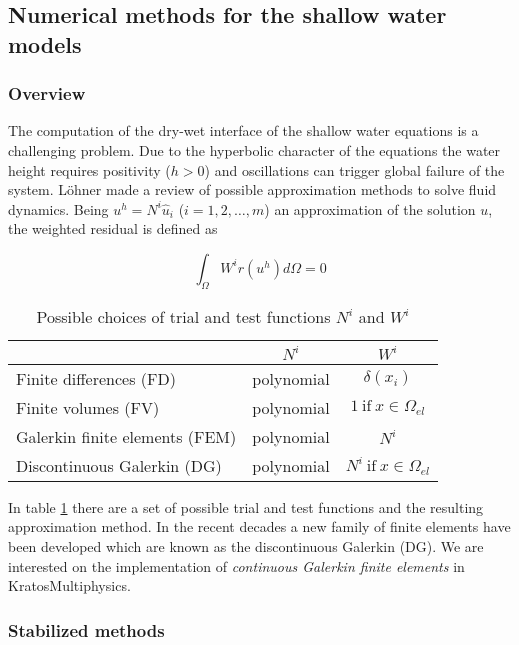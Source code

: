 \subsection{Numerical methods for the shallow water models}


\subsubsection{Overview}

The computation of the dry-wet interface of the shallow water equations is a challenging problem. Due to the hyperbolic character of the equations the water height requires positivity ($h>0$) and oscillations can trigger global failure of the system. Löhner \cite{lohner2008} made a review of possible approximation methods to solve fluid dynamics. Being $u^h = N^i\hat{u}_i$ ($i=1,2,\dots,m$) an approximation of the solution $u$, the weighted residual is defined as

\begin{equation}
\int_{\Omega} W^ir(u^h)d\Omega = 0
\end{equation}

\begin{table}
\centering
\begin{tabular}{|l|c|c|}
\hline
 & $N^i$ & $W^i$ \\ \hline
Finite differences (FD)         & polynomial & $\delta(x_i)$ \\ \hline
Finite volumes (FV)             & polynomial & $1 \ \text{if} \ x\in\Omega_{el}$ \\ \hline
Galerkin finite elements (FEM)  & polynomial & $N^i$ \\ \hline
Discontinuous Galerkin (DG)     & polynomial & $N^i \ \text{if} \ x\in\Omega_{el}$ \\ \hline
\end{tabular}
\caption{Possible choices of trial and test functions $N^i$ and $W^i$}
\label{possible_trial_functions}
\end{table}

In table \ref{possible_trial_functions} there are a set of possible trial and test functions and the resulting approximation method. In the recent decades a new family of finite elements have been developed which are known as the discontinuous Galerkin (DG). We are interested on the implementation of \emph{continuous Galerkin finite elements} in KratosMultiphysics.


\subsubsection{Stabilized methods}



